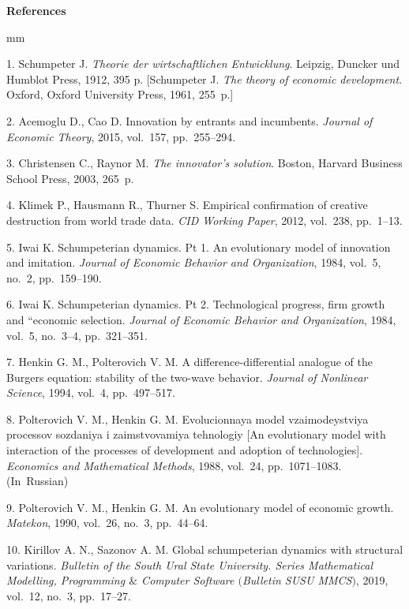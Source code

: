 

{\small



\vskip6mm

\noindent \textbf{References} }

mm

{\footnotesize



1. Schumpeter J. \textit{Theorie der wirtschaftlichen
Entwicklung}. Leipzig, Duncker und Humblot Press, 1912, 395 p.
[Schumpeter J. \textit{The theory of economic development}.
Oxford, Oxford University Press, 1961, 255~p.]

2. Acemoglu D., Cao D. Innovation by entrants and incumbents.
\textit{Journal of Economic Theory}, 2015, vol.~157, pp.~255--294.

3. Christensen C., Raynor M. \textit{The innovator's solution}.
Boston, Harvard Business School Press, 2003, 265~p.

4. Klimek P., Hausmann R., Thurner S. Empirical confirmation of
creative destruction from world trade data. \textit{CID Working
Paper}, 2012, vol.~238, pp.~1--13.

5. Iwai K. Schumpeterian dynamics. Pt 1. An evolutionary model of
innovation and imitation. \textit{Journal of Economic Behavior and
Organization}, 1984, vol.~5, no.~2, pp.~159--190.

6. Iwai K. Schumpeterian dynamics. Pt 2. Technological progress,
firm growth and ``economic selection. \textit{Journal of Economic
Behavior and Organization}, 1984, vol.~5, no.~3--4, pp.~321--351.

7. Henkin G. M., Polterovich V. M. A difference-differential
analogue of the Burgers equation: stability of the two-wave
behavior. \textit{Journal of Nonlinear Science}, 1994, vol.~4,
pp.~497--517.

8. Polterovich V. M., Henkin G. M. Evolucionnaya model
vzaimodeystviya processov sozdaniya i zaimstvovamiya tehnologiy
[An evolutionary model with interaction of the processes of
development and adoption of technologies]. \textit{Economics and
Mathematical Methods}, 1988, vol.~24, pp.~1071--1083. (In~Russian)

9. Polterovich V. M., Henkin G. M. An evolutionary model of
economic growth. \textit{Matekon}, 1990, vol.~26, no.~3,
pp.~44--64.

10. Kirillov A. N., Sazonov A. M. Global schumpeterian dynamics
with structural variations. \textit{Bulletin of the South Ural
State University. Series Mathematical Modelling, Programming $\&$
Computer Software $($Bulletin SUSU MMCS$)$}, 2019, vol.~12, no.~3,
pp.~17--27.

}
